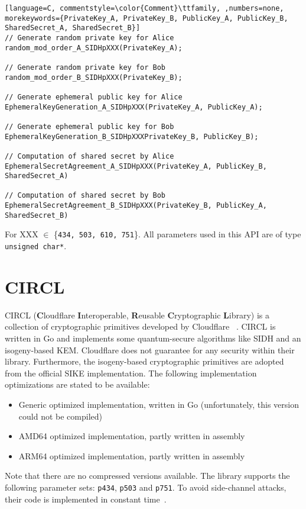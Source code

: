 \begin{lstlisting}[language=C, commentstyle=\color{Comment}\ttfamily, ,numbers=none, morekeywords={PrivateKey_A, PrivateKey_B, PublicKey_A, PublicKey_B, SharedSecret_A, SharedSecret_B}]
// Generate random private key for Alice
random_mod_order_A_SIDHpXXX(PrivateKey_A);

// Generate random private key for Bob
random_mod_order_B_SIDHpXXX(PrivateKey_B);

// Generate ephemeral public key for Alice
EphemeralKeyGeneration_A_SIDHpXXX(PrivateKey_A, PublicKey_A);

// Generate ephemeral public key for Bob
EphemeralKeyGeneration_B_SIDHpXXXPrivateKey_B, PublicKey_B);

// Computation of shared secret by Alice
EphemeralSecretAgreement_A_SIDHpXXX(PrivateKey_A, PublicKey_B, SharedSecret_A)

// Computation of shared secret by Bob
EphemeralSecretAgreement_B_SIDHpXXX(PrivateKey_B, PublicKey_A, SharedSecret_B)

\end{lstlisting}
For XXX $\in$ \{\texttt{434, 503, 610, 751}\}. All parameters used in this API are of type \texttt{unsigned char*}.

\section{CIRCL}

CIRCL (\textbf{C}loudflare \textbf{I}nteroperable, \textbf{R}eusable \textbf{C}ryptographic \textbf{L}ibrary) is a collection of cryptographic primitives developed by Cloudflare ~\parencite{circl2020github}. CIRCL is written in Go and implements some quantum-secure algorithms like SIDH and an isogeny-based KEM. Cloudflare does not guarantee for any security within their library. Furthermore, the isogeny-based cryptographic primitives are adopted from the official SIKE implementation. The following implementation optimizations are stated to be available:

\begin{itemize}
  \item Generic optimized implementation, written in Go (unfortunately, this version could not be compiled)
  \item AMD64 optimized implementation, partly written in assembly
  \item ARM64 optimized implementation, partly written in assembly
\end{itemize}
Note that there are no compressed versions available. The library supports the following parameter sets: \texttt{p434}, \texttt{p503} and \texttt{p751}. To avoid side-channel attacks, their code is implemented in constant time~\parencite{circl2019intro}.

